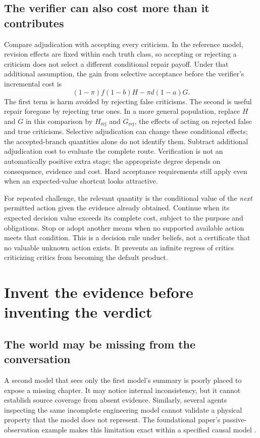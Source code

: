 \subsection{The verifier can also cost more than it contributes}
Compare adjudication with accepting every criticism. In the reference model, revision effects are fixed within each truth class, so accepting or rejecting a criticism does not select a different conditional repair payoff. Under that additional assumption, the gain from selective acceptance before the verifier's incremental cost is
\begin{equation}
(1-\pi)f(1-b)H-\pi d(1-a)G.
\end{equation}
The first term is harm avoided by rejecting false criticisms. The second is useful repair foregone by rejecting true ones. In a more general population, replace $H$ and $G$ in this comparison by $H_{\mathrm{rej}}$ and $G_{\mathrm{rej}}$, the effects of acting on rejected false and true criticisms. Selective adjudication can change these conditional effects; the accepted-branch quantities alone do not identify them. Subtract additional adjudication cost to evaluate the complete route. Verification is not an automatically positive extra stage; the appropriate degree depends on consequence, evidence and cost. Hard acceptance requirements still apply even when an expected-value shortcut looks attractive.

For repeated challenge, the relevant quantity is the conditional value of the \emph{next} permitted action given the evidence already obtained. Continue when its expected decision value exceeds its complete cost, subject to the purpose and obligations. Stop or adopt another means when no supported available action meets that condition. This is a decision rule under beliefs, not a certificate that no valuable unknown action exists. It prevents an infinite regress of critics criticizing critics from becoming the default product.

\section{Invent the evidence before inventing the verdict}
\label{sec:instrument}
\subsection{The world may be missing from the conversation}
A second model that sees only the first model's summary is poorly placed to expose a missing chapter. It may notice internal inconsistency, but it cannot establish source coverage from absent evidence. Similarly, several agents inspecting the same incomplete engineering model cannot validate a physical property that the model does not represent. The foundational paper's passive-observation example makes this limitation exact within a specified causal model \citep[\S3]{boucher_ti}.

